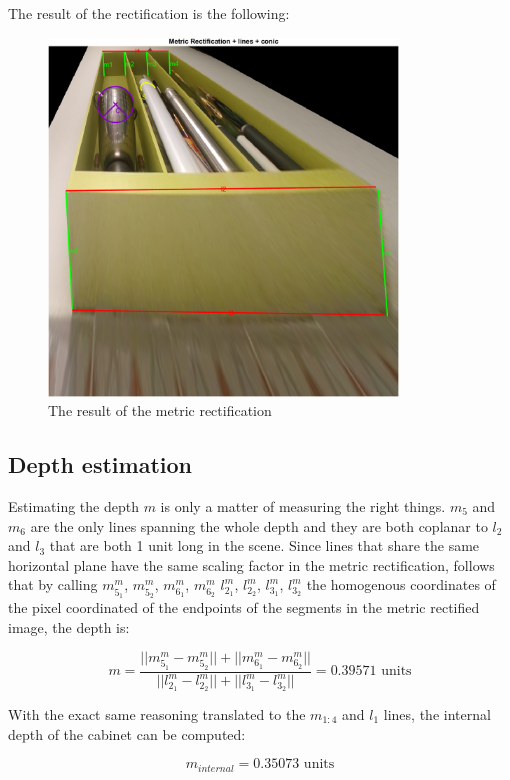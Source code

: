 The result of the rectification is the following:

\begin{figure}[H]
\centering
\includegraphics[height=9.5cm, width=\textwidth, keepaspectratio]{Report/Images/2.2-MetricRectification/Metric Rectification.png}
\caption{\label{fig:Metric rectification}The result of the metric rectification}
\end{figure}

\subsection{Depth estimation}
Estimating the depth $m$ is only a matter of measuring the right things. $m_5$ and $m_6$ are the only lines spanning the whole depth and they are both coplanar to $l_2$ and $l_3$ that are both 1 unit long in the scene. Since lines that share the same horizontal plane have the same scaling factor in the metric rectification, follows that by calling $m_{5_1}^m$, $m_{5_2}^m$, $m_{6_1}^m$, $m_{6_2}^m$ $l_{2_1}^m$, $l_{2_2}^m$, $l_{3_1}^m$, $l_{3_2}^m$ the homogenous coordinates of the pixel coordinated of the endpoints of the segments in the metric rectified image, the depth is:

$$
m = \frac{||m_{5_1}^m - m_{5_2}^m|| + ||m_{6_1}^m - m_{6_2}^m||}{||l_{2_1}^m - l_{2_2}^m|| + ||l_{3_1}^m - l_{3_2}^m||} = 0.39571 \text{ units} 
$$

With the exact same reasoning translated to the $m_{1:4}$ and $l_1$ lines, the internal depth of the cabinet can be computed:

$$
m_{internal} = 0.35073 \text{ units} 
$$

